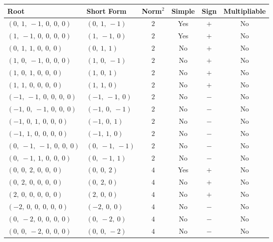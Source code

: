 \documentclass[11pt]{article}
\newcommand{\noi}{\noindent}
\theoremstyle{definition}
\begin{document}
\noi \begin{tabular}{|l|l|c|c|c|c|}
    \hline
    \textbf{Root} & \textbf{Short Form} & \textbf{Norm$^2$} & \textbf{Simple} & \textbf{Sign} & \textbf{Multipliable} \\
    \hline
    $\left( 0, \  1, \  -1, \  0, \  0, \  0\right)$ & $\left( 0, \  1, \  -1\right)$ & $2$ & Yes & $+$ & No \\
    \hline
    $\left( 1, \  -1, \  0, \  0, \  0, \  0\right)$ & $\left( 1, \  -1, \  0\right)$ & $2$ & Yes & $+$ & No \\
    \hline
    $\left( 0, \  1, \  1, \  0, \  0, \  0\right)$ & $\left( 0, \  1, \  1\right)$ & $2$ & No & $+$ & No \\
    \hline
    $\left( 1, \  0, \  -1, \  0, \  0, \  0\right)$ & $\left( 1, \  0, \  -1\right)$ & $2$ & No & $+$ & No \\
    \hline
    $\left( 1, \  0, \  1, \  0, \  0, \  0\right)$ & $\left( 1, \  0, \  1\right)$ & $2$ & No & $+$ & No \\
    \hline
    $\left( 1, \  1, \  0, \  0, \  0, \  0\right)$ & $\left( 1, \  1, \  0\right)$ & $2$ & No & $+$ & No \\
    \hline
    $\left( -1, \  -1, \  0, \  0, \  0, \  0\right)$ & $\left( -1, \  -1, \  0\right)$ & $2$ & No & $-$ & No \\
    \hline
    $\left( -1, \  0, \  -1, \  0, \  0, \  0\right)$ & $\left( -1, \  0, \  -1\right)$ & $2$ & No & $-$ & No \\
    \hline
    $\left( -1, \  0, \  1, \  0, \  0, \  0\right)$ & $\left( -1, \  0, \  1\right)$ & $2$ & No & $-$ & No \\
    \hline
    $\left( -1, \  1, \  0, \  0, \  0, \  0\right)$ & $\left( -1, \  1, \  0\right)$ & $2$ & No & $-$ & No \\
    \hline
    $\left( 0, \  -1, \  -1, \  0, \  0, \  0\right)$ & $\left( 0, \  -1, \  -1\right)$ & $2$ & No & $-$ & No \\
    \hline
    $\left( 0, \  -1, \  1, \  0, \  0, \  0\right)$ & $\left( 0, \  -1, \  1\right)$ & $2$ & No & $-$ & No \\
    \hline
    $\left( 0, \  0, \  2, \  0, \  0, \  0\right)$ & $\left( 0, \  0, \  2\right)$ & $4$ & Yes & $+$ & No \\
    \hline
    $\left( 0, \  2, \  0, \  0, \  0, \  0\right)$ & $\left( 0, \  2, \  0\right)$ & $4$ & No & $+$ & No \\
    \hline
    $\left( 2, \  0, \  0, \  0, \  0, \  0\right)$ & $\left( 2, \  0, \  0\right)$ & $4$ & No & $+$ & No \\
    \hline
    $\left( -2, \  0, \  0, \  0, \  0, \  0\right)$ & $\left( -2, \  0, \  0\right)$ & $4$ & No & $-$ & No \\
    \hline
    $\left( 0, \  -2, \  0, \  0, \  0, \  0\right)$ & $\left( 0, \  -2, \  0\right)$ & $4$ & No & $-$ & No \\
    \hline
    $\left( 0, \  0, \  -2, \  0, \  0, \  0\right)$ & $\left( 0, \  0, \  -2\right)$ & $4$ & No & $-$ & No \\
    \hline
\end{tabular}
\end{document}
